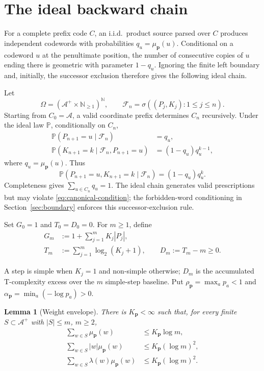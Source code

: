 \documentclass[journal]{IEEEtran}
\theoremstyle{plain}
\newtheorem{lemma}[theorem]{Lemma}
\theoremstyle{definition}
\theoremstyle{remark}
\newcommand{\A}{\mathcal A}
\newcommand{\F}{\mathcal F}
\newcommand{\Pideal}{\mathbb P}
\newcommand{\muP}{\mu_{\mathbf p}}
\newcommand{\rhoP}{\rho_{\mathbf p}}
\newcommand{\alphaP}{\alpha_{\mathbf p}}
\begin{document}
\section{The ideal backward chain}\label{sec:ideal}

For a complete prefix code $C$, an i.i.d.\ product source parsed over $C$ produces independent codewords with probabilities $q_u=\muP(u)$.  Conditional on a codeword $u$ at the penultimate position, the number of consecutive copies of $u$ ending there is geometric with parameter $1-q_u$.  Ignoring the finite left boundary and, initially, the successor exclusion therefore gives the following ideal chain.

Let
\begin{equation*}
 \Omega=(\A^+\times\mathbb N_{\ge1})^{\mathbb N},
 \qquad
 \F_n=\sigma((P_j,K_j):1\le j\le n).
\end{equation*}
Starting from $C_0=\A$, a valid coordinate prefix determines $C_n$ recursively.  Under the ideal law $\Pideal$, conditionally on $C_n$,
\begin{align}
 \Pideal(P_{n+1}=u\mid\F_n)&=q_u,\label{eq:ideal-prefix}\\
 \Pideal(K_{n+1}=k\mid\F_n,P_{n+1}=u)&=(1-q_u)q_u^{k-1},\label{eq:ideal-copy}
\end{align}
where $q_u=\muP(u)$.  Thus
\begin{equation}\label{eq:ideal-joint}
 \Pideal(P_{n+1}=u,K_{n+1}=k\mid\F_n)
 =(1-q_u)q_u^k.
\end{equation}
Completeness gives $\sum_{u\in C_n}q_u=1$.  The ideal chain generates valid prescriptions but may violate \eqref{eq:canonical-condition}; the forbidden-word conditioning in Section~\ref{sec:boundary} enforces this successor-exclusion rule.

Set $G_0=1$ and $T_0=D_0=0$.  For $m\ge1$, define
\begin{equation}\label{eq:ideal-functionals}
\begin{aligned}
 G_m&:=1+\sum_{j=1}^mK_j|P_j|,\\
 T_m&:=\sum_{j=1}^m\log_2(K_j+1),\qquad
 D_m:=T_m-m\ge0.
\end{aligned}
\end{equation}

A step is simple when $K_j=1$ and non-simple otherwise; $D_m$ is the accumulated T-complexity excess over the $m$ simple-step baseline.  Put $\rhoP=\max_a p_a<1$ and $\alphaP=\min_a(-\log p_a)>0$.

\begin{lemma}[Weight envelope]\label{lem:weight-envelope}
There is $K_{\mathbf p}<\infty$ such that, for every finite $S\subset\A^+$ with $|S|\le m$, $m\ge2$,
\begin{align}
 \sum_{w\in S}\muP(w)&\le K_{\mathbf p}\log m,\label{eq:weight-one}\\
 \sum_{w\in S}|w|\muP(w)&\le K_{\mathbf p}(\log m)^2,\label{eq:weight-two}\\
 \sum_{w\in S}\lambda(w)\muP(w)&\le K_{\mathbf p}(\log m)^2.\label{eq:weight-three}
\end{align}
\end{lemma}
\end{document}
